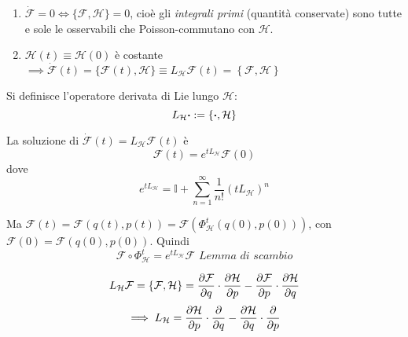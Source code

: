 \begin{enumerate}
    \item $\dot{\mathcal{F}}=0 \iff \{\mathcal{F},\mathcal{H}\}=0$, cioè    
    gli \textit{integrali primi} (quantità conservate) sono tutte e sole le osservabili
    che Poisson-commutano con $\mathcal{H}$.

    \item $\mathcal{H}(t)\equiv\mathcal{H}(0)$ è costante $\implies \dot{\mathcal{F}}(t)=\{\mathcal{F}(t),\mathcal{H}\}\equiv
    L_\mathcal{H}\mathcal{F}(t)= \left\{ \mathcal{F}, \mathcal{H} \right\}$
\end{enumerate}
\begin{definition}
    Si definisce l'operatore derivata di Lie lungo $\mathcal{H}$:
    \begin{equation}
        L_\mathcal{H}\vdot := \{\vdot,\mathcal{H}\}
    \end{equation}
\end{definition}
\begin{remark}
    La soluzione di $\dot{\mathcal{F}}(t)=L_\mathcal{H}\mathcal{F}(t)$ è
    \begin{equation}
        \mathcal{F}(t)=e^{tL_\mathcal{H}}\mathcal{F}(0)
    \end{equation}
    dove
    \begin{equation}
        e^{tL_\mathcal{H}} = \mathbb{I} + \sum_{n=1}^{\infty}\frac{1}{n!}(tL_\mathcal{H})^n
    \end{equation}
\end{remark}    

    Ma $\mathcal{F}(t)=\mathcal{F}(q(t),p(t))=\mathcal{F}(\Phi_\mathcal{H}^t(q(0),p(0)))$, con $\mathcal{F}(0)=\mathcal{F}(q(0),p(0))$.  
    Quindi
    \begin{equation}
        \mathcal{F}\circ \Phi_\mathcal{H}^t = e^{tL_\mathcal{H}}\mathcal{F} \textit{   Lemma di scambio}
    \end{equation}

\begin{remark}
    \begin{equation}
        L_\mathcal{H}\mathcal{F}=\{\mathcal{F},\mathcal{H}\}
        = \pdv{\mathcal{F}}{q}\cdot \pdv{\mathcal{H}}{p}
        - \pdv{\mathcal{F}}{p}\cdot \pdv{\mathcal{H}}{q}
    \end{equation}
    \begin{equation}
        \implies L_\mathcal{H}=
        \pdv{\mathcal{H}}{p}\cdot \pdv{}{q}
        - \pdv{\mathcal{H}}{q}\cdot \pdv{}{p}
    \end{equation}
\end{remark}

